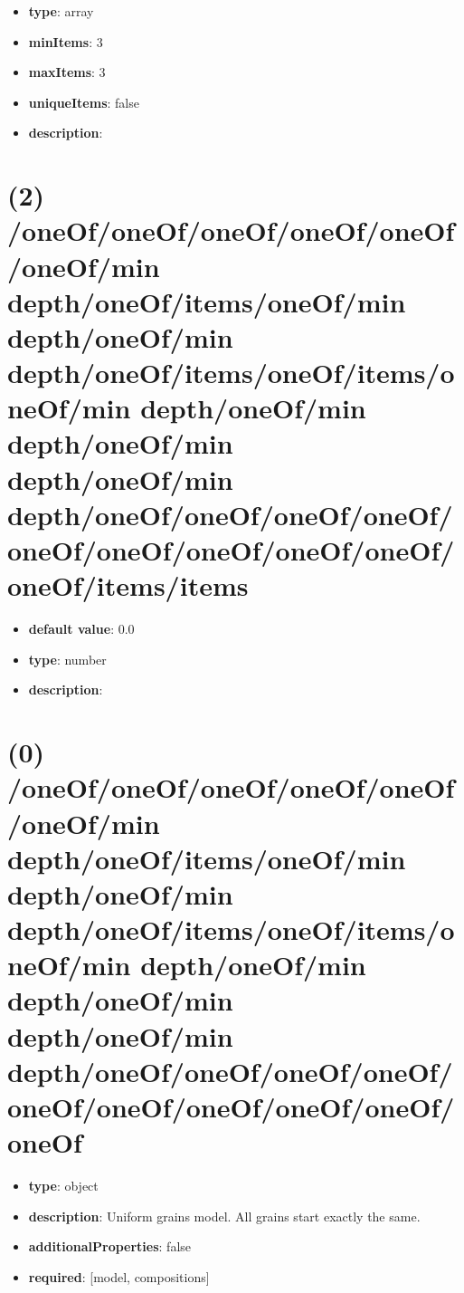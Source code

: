 \begin{itemize}[leftmargin=1em]\item {\bf type}: array
\item {\bf minItems}: 3
\item {\bf maxItems}: 3
\item {\bf uniqueItems}: false
\item {\bf description}: 
\end{itemize}\section{(2) /oneOf/oneOf/oneOf/oneOf/oneOf/oneOf/min depth/oneOf/items/oneOf/min depth/oneOf/min depth/oneOf/items/oneOf/items/oneOf/min depth/oneOf/min depth/oneOf/min depth/oneOf/min depth/oneOf/oneOf/oneOf/oneOf/oneOf/oneOf/oneOf/oneOf/oneOf/oneOf/items/items}
\begin{itemize}[leftmargin=2em]\item {\bf default value}: 0.0
\item {\bf type}: number
\item {\bf description}: 
\end{itemize}\section{(0) /oneOf/oneOf/oneOf/oneOf/oneOf/oneOf/min depth/oneOf/items/oneOf/min depth/oneOf/min depth/oneOf/items/oneOf/items/oneOf/min depth/oneOf/min depth/oneOf/min depth/oneOf/min depth/oneOf/oneOf/oneOf/oneOf/oneOf/oneOf/oneOf/oneOf/oneOf/oneOf}
\begin{itemize}[leftmargin=0em]\item {\bf type}: object
\item {\bf description}: Uniform grains model. All grains start exactly the same.
\item {\bf additionalProperties}: false
\item {\bf required}: [model, compositions]\end{itemize}
